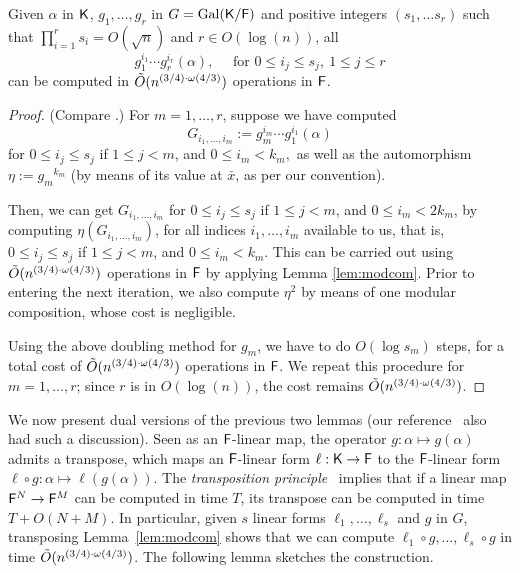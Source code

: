 \begin{lemma}\label{lem:selfcomp}
Given $\alpha$ in ${\mathsf{K}}$, $g_1, \ldots , g_{r}$ in $G =
\mathrm{Gal}({\mathsf{K}}/{\mathsf{F}})$ and positive integers $(s_1, \ldots s_r)$ such
that $\prod_{i = 1}^r s_i = O(\sqrt{n})$ and $r \in O(\log(n))$, all
  $$g_1^{i_1}\cdots g_r^{i_r}(\alpha) ,\quad \text{~for~} 0 \leq i_j
\leq s_j,\ 1 \leq j \leq r$$ can be computed in $\tilde{O}(n^{(3/4)\cdot \omega(4/3)})$
operations in ${\mathsf{F}}$.
\end{lemma}
\begin{proof}
(Compare \cite[Lemma~4]{KalSho98}.) For $m=1,\dots,r$, suppose we have computed 
  $$G_{i_1,\dots,i_m}:=g_m^{i_m}\cdots g_1^{i_1}(\alpha)$$ for $0 \leq
  i_j \leq s_j$ if $1 \leq j < m$, and $0 \leq i_m < k_m,$ as well as
  the automorphism $\eta:={g_m}^{k_m}$ (by means of its value at $\bar
  x$, as per our convention).
  
 Then, we can get $G_{i_1,\dots,i_m}$ for $0 \leq i_j \leq s_j$ if $1
 \leq j < m$, and $0 \leq i_m < 2k_m$, by computing
 $\eta(G_{i_1,\dots,i_m})$, for all indices $i_1,\dots,i_m$ available
 to us, that is, $0 \leq i_j \leq s_j$ if $1 \leq j < m$, and $0 \leq
 i_m < k_m$. This can be carried out using $\tilde{O}(n^{(3/4)\cdot \omega(4/3)})$ operations
 in ${\mathsf{F}}$ by applying Lemma \ref{lem:modcom}. Prior to entering the
 next iteration, we also compute $\eta^2$ by means of one modular
 composition, whose cost is negligible. 

 Using the above doubling method for $g_m$, we have to do $O(\log
 s_m)$ steps, for a total cost of $\tilde{O}(n^{(3/4)\cdot \omega(4/3)})$ operations in ${\mathsf{F}}$.  We
 repeat this procedure for $m=1,\dots,r$; since $r$ is in $O(\log(n))$,
 the cost remains $\tilde{O}(n^{(3/4)\cdot \omega(4/3)})$.
\end{proof}

We now present dual versions of the previous two lemmas (our
reference~\cite{KalSho98} also had such a discussion). Seen as an
${\mathsf{F}}$-linear map, the operator $g:\alpha \mapsto g(\alpha)$ admits a
transpose, which maps an ${\mathsf{F}}$-linear form $\ell:{\mathsf{K}}\to{\mathsf{F}}$ to the
${\mathsf{F}}$-linear form $\ell \circ g: \alpha \mapsto \ell(g(\alpha))$.  The
{\em transposition principle}~\cite{KaKiBs88,CaKaYa89} implies that if
a linear map ${\mathsf{F}}^N \to {\mathsf{F}}^M$ can be computed in time $T$, its
transpose can be computed in time $T+O(N+M)$. In particular, given $s$
linear forms $\ell_1,\dots,\ell_s$ and $g$ in $G$, transposing
Lemma~\ref{lem:modcom} shows that we can compute $\ell_1 \circ
g,\dots,\ell_s \circ g$ in time $\tilde{O}(n^{(3/4)\cdot \omega(4/3)})$. The following lemma
sketches the construction.


